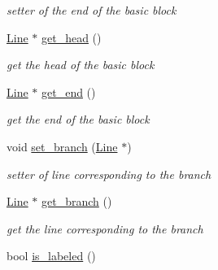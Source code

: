 \begin{DoxyCompactItemize}
\begin{DoxyCompactList}\small\item\em setter of the end of the basic block \end{DoxyCompactList}\item 
\hypertarget{class_basic__block_abe86f815d4a546391010e27511efa1e3}{}\hyperlink{class_line}{Line} $\ast$ \hyperlink{class_basic__block_abe86f815d4a546391010e27511efa1e3}{get\+\_\+head} ()\label{class_basic__block_abe86f815d4a546391010e27511efa1e3}

\begin{DoxyCompactList}\small\item\em get the head of the basic block \end{DoxyCompactList}\item 
\hypertarget{class_basic__block_a1540cc09dfd12636307e77b7d45b0b72}{}\hyperlink{class_line}{Line} $\ast$ \hyperlink{class_basic__block_a1540cc09dfd12636307e77b7d45b0b72}{get\+\_\+end} ()\label{class_basic__block_a1540cc09dfd12636307e77b7d45b0b72}

\begin{DoxyCompactList}\small\item\em get the end of the basic block \end{DoxyCompactList}\item 
\hypertarget{class_basic__block_a8e279325cafff22e2805cf0bd1b2b8d0}{}void \hyperlink{class_basic__block_a8e279325cafff22e2805cf0bd1b2b8d0}{set\+\_\+branch} (\hyperlink{class_line}{Line} $\ast$)\label{class_basic__block_a8e279325cafff22e2805cf0bd1b2b8d0}

\begin{DoxyCompactList}\small\item\em setter of line corresponding to the branch \end{DoxyCompactList}\item 
\hypertarget{class_basic__block_a0c0dbb20d9a86ab80878d168642b7cce}{}\hyperlink{class_line}{Line} $\ast$ \hyperlink{class_basic__block_a0c0dbb20d9a86ab80878d168642b7cce}{get\+\_\+branch} ()\label{class_basic__block_a0c0dbb20d9a86ab80878d168642b7cce}

\begin{DoxyCompactList}\small\item\em get the line corresponding to the branch \end{DoxyCompactList}\item 
\hypertarget{class_basic__block_a94840ac976b27d9024f4c04efb276ac1}{}bool \hyperlink{class_basic__block_a94840ac976b27d9024f4c04efb276ac1}{is\+\_\+labeled} ()\label{class_basic__block_a94840ac976b27d9024f4c04efb276ac1}


\end{DoxyCompactItemize}
